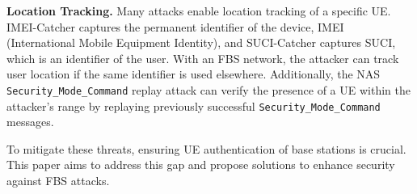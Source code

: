 \noindent \textbf{Location Tracking.}
Many attacks \cite{5gbasechecker, chlosta20215g, park2022doltest} enable location tracking of a specific UE. IMEI-Catcher \cite{park2022doltest} captures the permanent identifier of the device, IMEI (International Mobile Equipment Identity), and SUCI-Catcher \cite{chlosta20215g} captures SUCI, which is an identifier of the user. With an FBS network, the attacker can track user location if the same identifier is used elsewhere. Additionally, the NAS \texttt{Security\_Mode\_Command} replay attack \cite{5gbasechecker, hussain2018lteinspector} can verify the presence of a UE within the attacker's range by replaying previously successful \texttt{Security\_Mode\_Command} messages.

To mitigate these threats, ensuring UE authentication of base stations is crucial. This paper aims to address this gap and propose solutions to enhance security against FBS attacks.